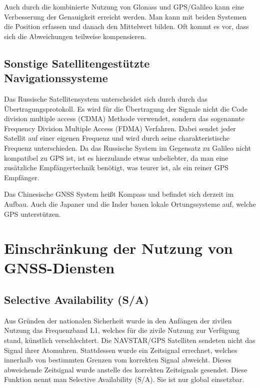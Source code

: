 \documentclass[letterpaper,11pt,ngerman]{andi}
\begin{document}
Auch durch die kombinierte Nutzung von Glonass und GPS/Galileo kann eine Verbesserung der Genauigkeit erreicht werden. Man kann mit beiden Systemen die Position erfassen und danach den Mittelwert bilden. Oft kommt es vor, dass sich die Abweichungen teilweise kompensieren.


\subsection{Sonstige Satellitengestützte Navigationssysteme}
\label{included_projects/gps/GPS_SPEC/content:sonstige-satellitengestutzte-navigationssysteme}
Das Russische Satellitensystem unterscheidet sich durch durch das Übertragungsprotokoll. Es wird für die Übertragung der Signale nicht die Code division multiple access (CDMA) Methode verwendet, sondern das sogenannte Frequency Division Multiple Access (FDMA) Verfahren. Dabei sendet jeder Satellit auf einer eigenen Frequenz und wird durch seine charakteristische Frequenz unterschieden.  Da das Russische System im Gegensatz zu Galileo nicht kompatibel zu GPS ist, ist es hierzulande etwas unbeliebter, da man eine zusätzliche Empfängertechnik benötigt, was teurer ist, als ein reiner GPS Empfänger. \cite{podcast}

Das Chinesische GNSS System heißt Kompass und befindet sich derzeit im Aufbau. Auch die Japaner und die Inder bauen lokale Ortungssysteme auf, welche GPS unterstützen.


\section{Einschränkung der Nutzung von GNSS-Diensten}
\label{included_projects/gps/GPS_SPEC/content:einschrankung-der-nutzung-von-gnss-diensten}

\subsection{Selective Availability (S/A)}
\label{included_projects/gps/GPS_SPEC/content:selective-availability-s-a}
Aus Gründen der nationalen Sicherheit wurde in den Anfängen der zivilen Nutzung das Frequenzband L1, welches für die zivile Nutzung zur Verfügung stand, künstlich verschlechtert. Die NAVSTAR/GPS Satelliten sendeten nicht das Signal ihrer Atomuhren. Stattdessen wurde ein Zeitsignal errechnet, welches innerhalb von bestimmten Grenzen vom korrekten Signal abweicht. Dieses abweichende Zeitsignal wurde anstelle des korrekten Zeitsignals gesendet. Diese Funktion nennt man Selective Availability (S/A). Sie ist nur global einsetzbar. \cite{sat_nav_dodel}
\end{document}
